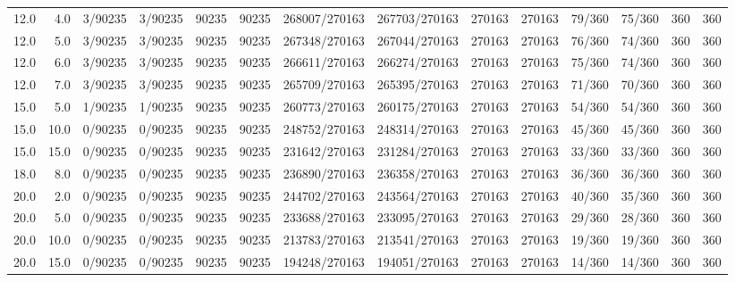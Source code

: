 \begin{tabular}{rrllrrllrrllrr}
12.0 &  4.0 &         3/90235 &    3/90235 &          90235 &      90235 & 268007/270163 & 267703/270163 &         270163 &     270163 &      79/360 &     75/360 &        360 &        360 \\
12.0 &  5.0 &         3/90235 &    3/90235 &          90235 &      90235 & 267348/270163 & 267044/270163 &         270163 &     270163 &      76/360 &     74/360 &        360 &        360 \\
12.0 &  6.0 &         3/90235 &    3/90235 &          90235 &      90235 & 266611/270163 & 266274/270163 &         270163 &     270163 &      75/360 &     74/360 &        360 &        360 \\
12.0 &  7.0 &         3/90235 &    3/90235 &          90235 &      90235 & 265709/270163 & 265395/270163 &         270163 &     270163 &      71/360 &     70/360 &        360 &        360 \\
15.0 &  5.0 &         1/90235 &    1/90235 &          90235 &      90235 & 260773/270163 & 260175/270163 &         270163 &     270163 &      54/360 &     54/360 &        360 &        360 \\
15.0 & 10.0 &         0/90235 &    0/90235 &          90235 &      90235 & 248752/270163 & 248314/270163 &         270163 &     270163 &      45/360 &     45/360 &        360 &        360 \\
15.0 & 15.0 &         0/90235 &    0/90235 &          90235 &      90235 & 231642/270163 & 231284/270163 &         270163 &     270163 &      33/360 &     33/360 &        360 &        360 \\
18.0 &  8.0 &         0/90235 &    0/90235 &          90235 &      90235 & 236890/270163 & 236358/270163 &         270163 &     270163 &      36/360 &     36/360 &        360 &        360 \\
20.0 &  2.0 &         0/90235 &    0/90235 &          90235 &      90235 & 244702/270163 & 243564/270163 &         270163 &     270163 &      40/360 &     35/360 &        360 &        360 \\
20.0 &  5.0 &         0/90235 &    0/90235 &          90235 &      90235 & 233688/270163 & 233095/270163 &         270163 &     270163 &      29/360 &     28/360 &        360 &        360 \\
20.0 & 10.0 &         0/90235 &    0/90235 &          90235 &      90235 & 213783/270163 & 213541/270163 &         270163 &     270163 &      19/360 &     19/360 &        360 &        360 \\
20.0 & 15.0 &         0/90235 &    0/90235 &          90235 &      90235 & 194248/270163 & 194051/270163 &         270163 &     270163 &      14/360 &     14/360 &        360 &        360 \\

\end{tabular}
